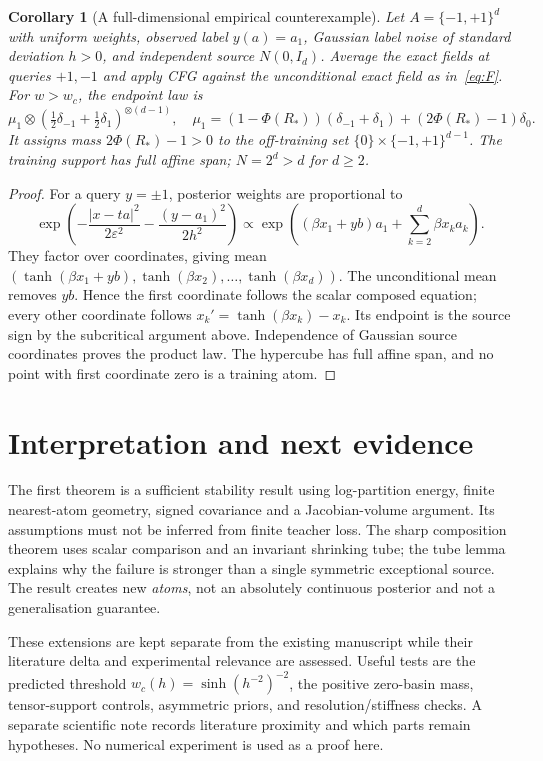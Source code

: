\documentclass[11pt]{article}
\newtheorem{corollary}{Corollary}
\newcommand{\eps}{\varepsilon}
\begin{document}
\clearpage
\begin{corollary}[A full-dimensional empirical counterexample]\label{cor:tensor}
Let $A=\{-1,+1\}^d$ with uniform weights, observed label $y(a)=a_1$,
Gaussian label noise of standard deviation $h>0$, and independent source
$N(0,I_d)$. Average the exact fields at queries $+1,-1$ and apply CFG against
the unconditional exact field as in~\eqref{eq:F}. For $w>w_c$, the endpoint
law is
\[
 \mu_1\otimes(\tfrac12\delta_{-1}+\tfrac12\delta_1)^{\otimes(d-1)},\quad
 \mu_1=(1-\Phi(R_*))(\delta_{-1}+\delta_1)
 +(2\Phi(R_*)-1)\delta_0.
\]
It assigns mass $2\Phi(R_*)-1>0$ to the off-training set
$\{0\}\times\{-1,+1\}^{d-1}$. The training support has full affine span;
$N=2^d>d$ for $d\ge2$.
\end{corollary}
\begin{proof}
For a query $y=\pm1$, posterior weights are proportional to
\[
 \exp\left(-\frac{|x-ta|^2}{2\eps^2}
           -\frac{(y-a_1)^2}{2h^2}\right)
 \propto\exp\left((\beta x_1+yb)a_1+\sum_{k=2}^d\beta x_ka_k\right).
\]
They factor over coordinates, giving mean
$(\tanh(\beta x_1+yb),\tanh(\beta x_2),\ldots,\tanh(\beta x_d))$.
The unconditional mean removes $yb$. Hence the first coordinate follows the
scalar composed equation; every other coordinate follows
$x_k'=\tanh(\beta x_k)-x_k$. Its endpoint is the source sign by the
subcritical argument above. Independence of Gaussian source coordinates
proves the product law. The hypercube has full affine span, and no point with
first coordinate zero is a training atom.
\end{proof}

\section{Interpretation and next evidence}
The first theorem is a sufficient stability result using log-partition energy,
finite nearest-atom geometry, signed covariance and a Jacobian-volume
argument. Its assumptions must not be inferred from finite teacher loss.
The sharp composition theorem uses scalar comparison and an invariant
shrinking tube; the tube lemma explains why the failure is stronger than a
single symmetric exceptional source. The result creates new \emph{atoms},
not an absolutely continuous posterior and not a generalisation guarantee.

These extensions are kept separate from the existing manuscript while
their literature delta and experimental relevance are assessed. Useful tests are
the predicted threshold $w_c(h)=\sinh(h^{-2})^{-2}$, the positive zero-basin
mass, tensor-support controls, asymmetric priors, and resolution/stiffness
checks. A separate scientific note records literature proximity and which
parts remain hypotheses. No numerical experiment is used as a proof here.
\end{document}
